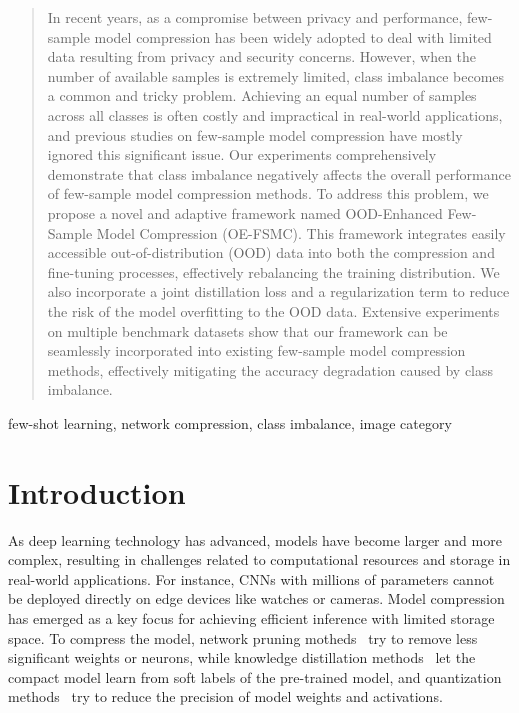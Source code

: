 \documentclass[twoside,11pt]{article}
\begin{document}
\begin{abstract}
In recent years, as a compromise between privacy and performance, few-sample model compression has been widely adopted to deal with limited data resulting from privacy and security concerns. However, when the number of available samples is extremely limited, class imbalance becomes a common and tricky problem. Achieving an equal number of samples across all classes is often costly and impractical in real-world applications, and previous studies on few-sample model compression have mostly ignored this significant issue. Our experiments comprehensively demonstrate that class imbalance negatively affects the overall performance of few-sample model compression methods. To address this problem, we propose a novel and adaptive framework named OOD-Enhanced Few-Sample Model Compression (OE-FSMC). This framework integrates easily accessible out-of-distribution (OOD) data into both the compression and fine-tuning processes, effectively rebalancing the training distribution. We also incorporate a joint distillation loss and a regularization term to reduce the risk of the model overfitting to the OOD data. Extensive experiments on multiple benchmark datasets show that our framework can be seamlessly incorporated into existing few-sample model compression methods, effectively mitigating the accuracy degradation caused by class imbalance.
\end{abstract}

\begin{keywords}
  few-shot learning, network compression, class imbalance, image category
\end{keywords}

\section{Introduction}
As deep learning technology has advanced, models have become larger and more complex, resulting in challenges related to computational resources and storage in real-world applications. For instance, CNNs with millions of parameters cannot be deployed directly on edge devices like watches or cameras. Model compression has emerged as a key focus for achieving efficient inference with limited storage space. To compress the model, network pruning motheds~\citep{hao2017pruning,yihuiChannel2017} try to remove less significant weights or neurons, while knowledge distillation methods~\citep{hinton2015distilling} let the compact model learn from soft labels of the pre-trained model, and quantization methods~\citep{nagel2019data,adrianafitnet2015} try to reduce the precision of model weights and activations.
\end{document}
